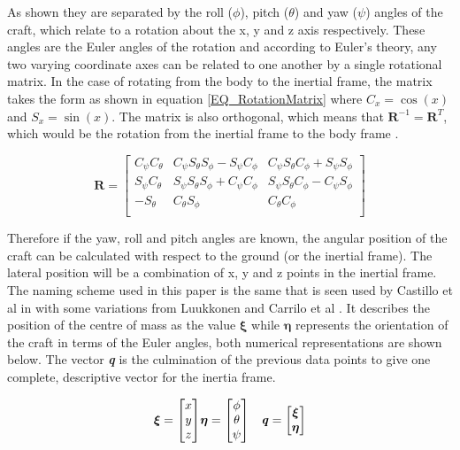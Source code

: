 As shown they are separated by the roll ($\phi$), pitch ($\theta$) and yaw ($\psi$) angles of the craft, which relate to a rotation about the x, y and z axis respectively. These angles are the Euler angles of the rotation and according to Euler's theory, any two varying coordinate axes can be related to one another by a single rotational matrix. In the case of rotating from the body to the inertial frame, the matrix takes the form as shown in equation \eqref{EQ_RotationMatrix} \cite{Luukkonen} where $C_x = \cos(x)$ and $S_x = \sin(x)$. The matrix is also orthogonal, which means that $\textbf{R}^{-1} = \textbf{R}^T$, which would be the rotation from the inertial frame to the body frame \cite{Luukkonen, MiniFlying}.

\begin{equation}
\label{EQ_RotationMatrix}
\textbf{R} = 
\begin{bmatrix}
C_\psi C_\theta   	& C_\psi S_\theta S_\phi - S_\psi C_\phi & C_\psi S_\theta C_\phi + S_\psi S_\phi \\
S_\psi C_\theta   	& S_\psi S_\theta S_\phi + C_\psi C_\phi & S_\psi S_\theta C_\phi - C_\psi S_\phi\\
-S_\theta   		& C_\theta S_\phi & C_\theta C_\phi  \\
\end{bmatrix}
\end{equation}

Therefore if the yaw, roll and pitch angles are known, the angular position of the craft can be calculated with respect to the ground (or the inertial frame). The lateral position will be a combination of x, y and z points in the inertial frame. The naming scheme used in this paper is the same that is seen used by Castillo et al in \cite{MiniFlying, RealTime} with some variations from Luukkonen \cite{Luukkonen} and Carrilo et al \cite{Modelling}. It describes the position of the centre of mass as the value $\boldsymbol{\xi}$ while $\boldsymbol{\eta}$ represents the orientation of the craft in terms of the Euler angles, both numerical representations are shown below. The vector \textbf{\textit{q}} is the culmination of the previous data points to give one complete, descriptive vector for the inertia frame.

\begin{eqnarray}
\boldsymbol{\xi}= 
\begin{bmatrix}
x\\
y\\
z
\end{bmatrix}&
\boldsymbol{\eta} = 
\begin{bmatrix}
\phi\\
\theta\\
\psi
\end{bmatrix}& 
\textbf{\textit{q}} = 
\begin{bmatrix}
\boldsymbol{\xi}\\
\boldsymbol{\eta}
\end{bmatrix}
\label{EQ_InertiaFrame}
\end{eqnarray}

